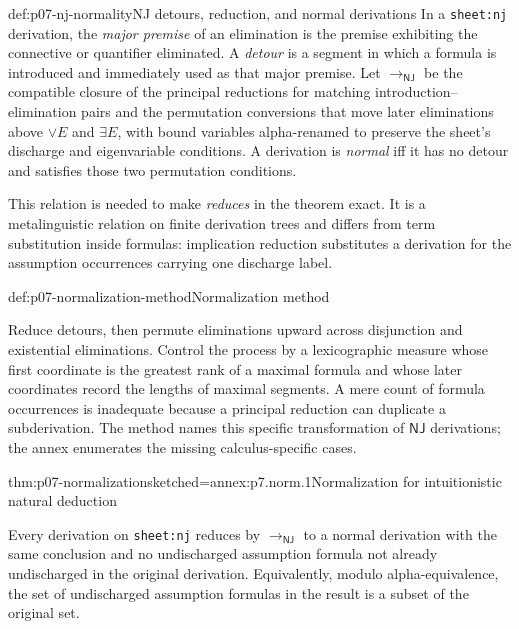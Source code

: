 \begin{hbdefinition}{def:p07-nj-normality}{NJ detours, reduction, and normal derivations}
In a \texttt{sheet:nj} derivation, the \emph{major premise} of an elimination
is the premise exhibiting the connective or quantifier eliminated.  A
\emph{detour} is a segment in which a formula is introduced and immediately
used as that major premise.  Let
\(\longrightarrow_{\mathsf{NJ}}\) be the compatible closure of the principal
reductions for matching introduction--elimination pairs and the permutation
conversions that move later eliminations above \(\lor E\) and \(\exists E\),
with bound variables alpha-renamed to preserve the sheet's discharge and
eigenvariable conditions.  A derivation is \emph{normal} iff it has no detour
and satisfies those two permutation conditions.

This relation is needed to make \emph{reduces} in the theorem exact.  It is a
metalinguistic relation on finite derivation trees and differs from term
substitution inside formulas: implication reduction substitutes a derivation
for the assumption occurrences carrying one discharge label.
\end{hbdefinition}

\begin{hbmethod}{def:p07-normalization-method}{Normalization method}
\par\noindent
Reduce detours, then permute eliminations upward across disjunction and
existential eliminations.  Control the process by a
lexicographic measure whose first coordinate is the greatest rank of a
maximal formula and whose later coordinates record the lengths of maximal
segments.  A mere count of formula occurrences is inadequate because a
principal reduction can duplicate a subderivation.  The method names this
specific transformation of \(\mathsf{NJ}\) derivations; the annex enumerates
the missing calculus-specific cases.
\end{hbmethod}

\begin{hbtheorem}{thm:p07-normalization}{sketched=annex:p7.norm.1}{Normalization for intuitionistic natural deduction}
\par\noindent
Every derivation on \texttt{sheet:nj} reduces by
\(\longrightarrow_{\mathsf{NJ}}\) to a normal derivation with the same
conclusion and no undischarged assumption formula not already undischarged in
the original derivation.  Equivalently, modulo alpha-equivalence, the set of
undischarged assumption formulas in the result is a subset of the original
set.
\end{hbtheorem}

